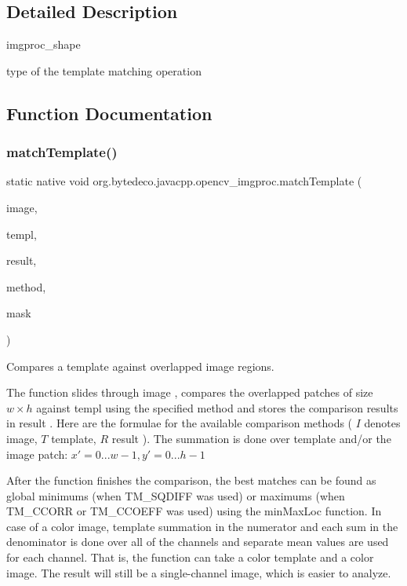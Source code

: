 \subsection{Detailed Description}
imgproc\+\_\+shape 

type of the template matching operation 

\subsection{Function Documentation}
\mbox{\label{group__imgproc__object_ga9a21de5c468f2b954413017382a99d29}} 
\subsubsection{\texorpdfstring{match\+Template()}{matchTemplate()}}
{\footnotesize\ttfamily static native void org.\+bytedeco.\+javacpp.\+opencv\+\_\+imgproc.\+match\+Template (\begin{DoxyParamCaption}\item[{@By\+Val Mat}]{image,  }\item[{@By\+Val Mat}]{templ,  }\item[{@By\+Val Mat}]{result,  }\item[{int}]{method,  }\item[{@By\+Val(null\+Value=\char`\"{}cv\+::\+Input\+Array(cv\+::no\+Array())\char`\"{}) Mat}]{mask }\end{DoxyParamCaption})\hspace{0.3cm}{\ttfamily [static]}}



Compares a template against overlapped image regions. 

The function slides through image , compares the overlapped patches of size $w \times h$ against templ using the specified method and stores the comparison results in result . Here are the formulae for the available comparison methods ( $I$ denotes image, $T$ template, $R$ result ). The summation is done over template and/or the image patch\+: $x' = 0...w-1, y' = 0...h-1$ 

After the function finishes the comparison, the best matches can be found as global minimums (when T\+M\+\_\+\+S\+Q\+D\+I\+FF was used) or maximums (when T\+M\+\_\+\+C\+C\+O\+RR or T\+M\+\_\+\+C\+C\+O\+E\+FF was used) using the min\+Max\+Loc function. In case of a color image, template summation in the numerator and each sum in the denominator is done over all of the channels and separate mean values are used for each channel. That is, the function can take a color template and a color image. The result will still be a single-\/channel image, which is easier to analyze. 


